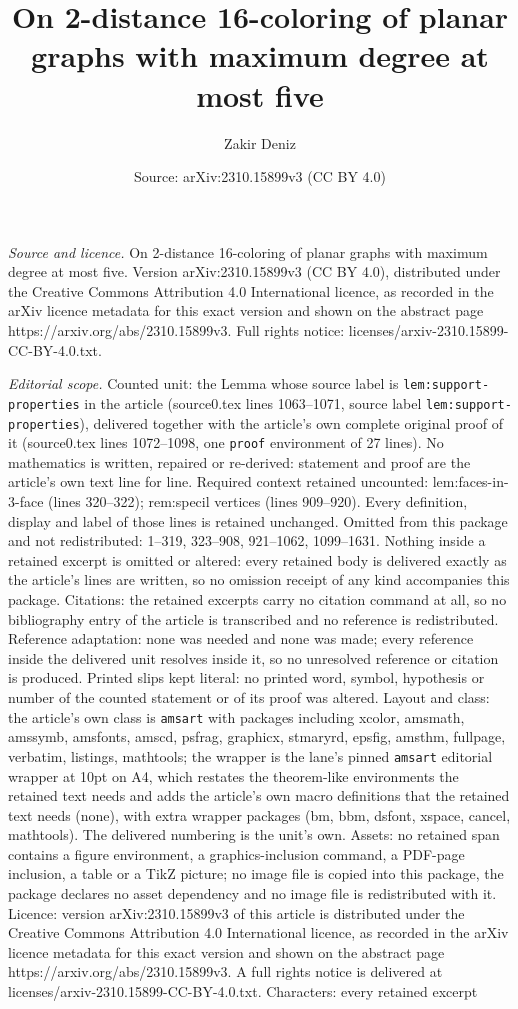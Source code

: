 \documentclass[10pt,a4paper]{amsart}
\title[On 2-distance 16-coloring of planar graphs with maximum degr]{On 2-distance 16-coloring of planar graphs with maximum degree at most five}
\author{Zakir Deniz}
\date{Source: arXiv:2310.15899v3 (CC BY 4.0)}
\begin{document}
\maketitle

\noindent\emph{Source and licence.} On 2-distance 16-coloring of planar graphs with maximum degree at most five. Version arXiv:2310.15899v3 (CC BY 4.0), distributed under the Creative Commons Attribution 4.0 International licence, as recorded in the arXiv licence metadata for this exact version and shown on the abstract page https://arxiv.org/abs/2310.15899v3. Full rights notice: licenses/arxiv-2310.15899-CC-BY-4.0.txt.\par\smallskip

\noindent\textit{Editorial scope.} Counted unit: the Lemma whose source label is \texttt{lem:support-properties} in the article (source0.tex lines 1063--1071, source label \texttt{lem:support-properties}), delivered together with the article's own complete original proof of it (source0.tex lines 1072--1098, one \texttt{proof} environment of 27 lines). No mathematics is written, repaired or re-derived: statement and proof are the article's own text line for line. Required context retained uncounted: lem:faces-in-3-face (lines 320--322); rem:specil vertices (lines 909--920). Every definition, display and label of those lines is retained unchanged. Omitted from this package and not redistributed: 1--319, 323--908, 921--1062, 1099--1631. Nothing inside a retained excerpt is omitted or altered: every retained body is delivered exactly as the article's lines are written, so no omission receipt of any kind accompanies this package. Citations: the retained excerpts carry no citation command at all, so no bibliography entry of the article is transcribed and no reference is redistributed. Reference adaptation: none was needed and none was made; every reference inside the delivered unit resolves inside it, so no unresolved reference or citation is produced. Printed slips kept literal: no printed word, symbol, hypothesis or number of the counted statement or of its proof was altered. Layout and class: the article's own class is \texttt{amsart} with packages including xcolor, amsmath, amssymb, amsfonts, amscd, psfrag, graphicx, stmaryrd, epsfig, amsthm, fullpage, verbatim, listings, mathtools; the wrapper is the lane's pinned \texttt{amsart} editorial wrapper at 10pt on A4, which restates the theorem-like environments the retained text needs and adds the article's own macro definitions that the retained text needs (none), with extra wrapper packages (bm, bbm, dsfont, xspace, cancel, mathtools). The delivered numbering is the unit's own. Assets: no retained span contains a figure environment, a graphics-inclusion command, a PDF-page inclusion, a table or a TikZ picture; no image file is copied into this package, the package declares no asset dependency and no image file is redistributed with it. Licence: version arXiv:2310.15899v3 of this article is distributed under the Creative Commons Attribution 4.0 International licence, as recorded in the arXiv licence metadata for this exact version and shown on the abstract page https://arxiv.org/abs/2310.15899v3. A full rights notice is delivered at licenses/arxiv-2310.15899-CC-BY-4.0.txt. Characters: every retained excerpt 
\end{document}
